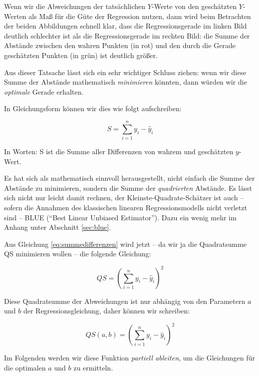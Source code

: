 \documentclass[ngerman, 12pt,parskip=half]{scrartcl}
\def\sm{\sum\limits_{i=1}^{n}}
\begin{document}
Wenn wir die Abweichungen der tatsächlichen \(Y\)-Werte von den geschätzten \(Y\)-Werten als Maß für die Güte der Regression nutzen, dann wird beim Betrachten der beiden Abbildungen schnell klar, dass die Regressionsgerade im linken Bild deutlich schlechter ist als die Regressionsgerade im rechten Bild: die Summe der Abstände zwischen den wahren Punkten (in rot) und den durch die Gerade geschätzten Punkten (in grün) ist deutlich größer.

Aus dieser Tatsache lässt sich ein sehr wichtiger Schluss ziehen: wenn wir diese Summe der Abstände mathematisch \textit{minimieren} könnten, dann würden wir die \textit{optimale}   
Gerade erhalten. 

In Gleichungsform können wir dies wie folgt aufschreiben:

\begin{equation}
S = \sm y_i - \hat{y}_i\label{eq:summedifferenzen}
\end{equation}

In Worten: S ist die Summe aller Differenzen von wahrem und geschätzten $y$-Wert.

Es hat sich als mathematisch sinnvoll herausgestellt, nicht einfach die Summe der Abstände zu minimieren, sondern die Summe der \textit{quadrierten} Abstände. 
Es lässt sich nicht nur leicht damit rechnen, der Kleinste-Quadrate-Schätzer ist auch -- sofern die  Annahmen des klassischen linearen Regressionsmodells nicht verletzt sind -- BLUE (\enquote{Best Linear Unbiased Estimator}). Dazu ein wenig mehr im Anhang unter Abschnitt \ref{sec:blue}. 

Aus Gleichung \ref{eq:summedifferenzen} wird jetzt -- da wir ja die Quadratsumme QS minimieren wollen -- die folgende Gleichung:

\begin{equation}
QS = \left(\sm y_i - \hat{y}_i\right)^2\label{eq:qabstaende}
\end{equation}

Diese Quadratsumme der Abweichungen ist nur abhängig von den Parametern \(a\) und \(b\) der Regressionsgleichung, daher können wir schreiben:

\begin{equation}
QS(a,b) = \left(\sm y_i - \hat{y}_i\right)^2
\end{equation}%


Im Folgenden werden wir diese Funktion \textit{partiell ableiten}, um die Gleichungen für die optimalen \(a\) und \(b\) zu ermitteln. 
\end{document}
